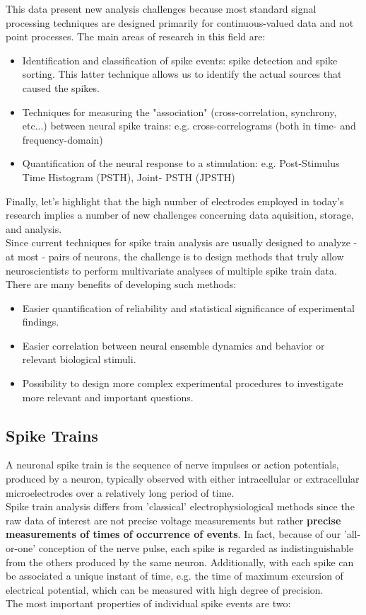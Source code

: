 This data present new analysis challenges because most standard signal 
processing techniques are designed primarily for continuous-valued data 
and not point processes. 
The main areas of research in this field are:
\begin{itemize}
    \item Identification and classification of spike events: spike 
detection and spike sorting. This latter technique allows us to identify 
the actual sources that caused the spikes.
    \item Techniques for measuring the "association" (cross-correlation, 
synchrony, etc...) between neural spike trains: e.g. cross-correlograms 
(both in time- and frequency-domain) 
    \item Quantification of the neural response to a stimulation: e.g. 
Post-Stimulus Time Histogram (PSTH), Joint- PSTH (JPSTH) 
\end{itemize}

Finally, let's highlight that the high number of electrodes employed in 
today's research implies a number of new challenges concerning data 
aquisition, storage, and analysis.\\
Since current techniques for spike train analysis are usually designed to 
analyze - at most - pairs of neurons, the challenge is to design methods 
that truly allow neuroscientists to perform multivariate analyses of 
multiple spike train data.
There are many benefits of developing such methods:
\begin{itemize}
    \item Easier quantification of reliability and statistical 
significance of experimental findings.
    \item Easier correlation between neural ensemble dynamics and behavior 
or relevant biological stimuli.
    \item Possibility to design more complex experimental procedures to 
investigate more relevant and important questions.
\end{itemize}

\subsection{Spike Trains}
A neuronal spike train is the sequence of nerve impulses or action 
potentials, produced by a neuron, typically observed with either 
intracellular or extracellular microelectrodes over a relatively long 
period of time. \\
Spike train analysis differs from 'classical' electrophysiological methods 
since the raw data of interest are not precise voltage measurements but 
rather \textbf{precise measurements of times of occurrence of events}. In 
fact, because of our 'all-or-one' conception of the nerve pulse, each 
spike is regarded as indistinguishable from the others produced by the 
same neuron. Additionally, with each spike can be associated a unique 
instant of time, e.g. the time of maximum excursion of electrical 
potential, which can be measured with high degree of precision. \\
The most important properties of individual spike events are two:

